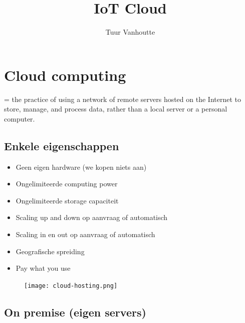 \documentclass{article}
\begin{document}
\begin{titlepage}
    \author{Tuur Vanhoutte}
    \title{IoT Cloud}
\end{titlepage}

\maketitle
\newpage
\tableofcontents
\newpage


\section{Cloud computing}

= the practice of using a network of remote servers hosted on the Internet to store, manage, and process data, rather than a local server or a personal computer.

\subsection{Enkele eigenschappen}
\begin{itemize}
    \item Geen eigen hardware (we kopen niets aan)
    \item Ongelimiteerde computing power
    \item Ongelimiteerde storage capaciteit
    \item Scaling up and down op aanvraag of
    automatisch
    \item Scaling in en out op aanvraag of
    automatisch
    \item Geografische spreiding
    \item Pay what you use
\end{itemize}

\begin{figure}[H]
    \centering
    \texttt{[image: cloud-hosting.png]}
    \caption{}
\end{figure}


\subsection{On premise (eigen servers)}
\end{document}
